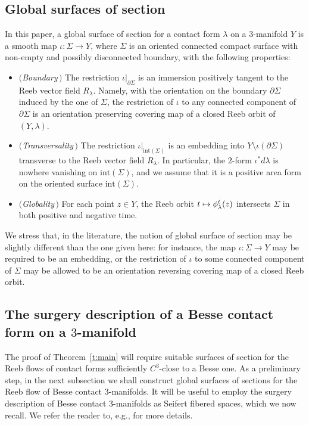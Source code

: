 \documentclass[10pt,a4paper]{amsart}
\newcommand\mto{\mathchoice{\longmapsto}{\mapsto}{\mapsto}{\mapsto}}
\theoremstyle{definition}
\let\diff d
\providecommand{\Subsection}{\subsection}
\begin{document}
\subsection{Global surfaces of section}
\label{s:sos_def}
In this paper, a global surface of section for a contact form $\lambda$ on a $3$-manifold $Y$ is a smooth map $\iota:\Sigma\to Y$, where $\Sigma$ is an oriented connected compact surface with non-empty and possibly disconnected boundary, with the following properties:
\begin{itemize}

\item \textit{$($Boundary$\,)$} The restriction $\iota|_{\partial\Sigma}$ is an immersion positively tangent to the Reeb vector field $R_{\lambda}$. Namely, with the orientation on the boundary $\partial\Sigma$ induced by the one of $\Sigma$,
the restriction of $\iota$ to any connected component of $\partial\Sigma$ is an orientation preserving covering map of a closed Reeb orbit of $(Y,\lambda)$.\vspace{2pt}

\item \textit{$($Transversality$\,)$} The restriction $\iota|_{\mathrm{int}(\Sigma)}$ is an embedding into $Y\setminus\iota(\partial\Sigma)$ transverse to the Reeb vector field $R_\lambda$.
In particular, the $2$-form $\iota^*\diff\lambda$ is nowhere vanishing on $\mathrm{int}(\Sigma)$, and we assume that it is a positive area form on the oriented surface $\mathrm{int}(\Sigma)$.\vspace{2pt}

\item \textit{$($Globality$\,)$} For each point $z\in Y$, the Reeb orbit $t\mto\phi_\lambda^t(z)$ intersects $\Sigma$ in both positive and negative time.

\end{itemize}
We stress that, in the literature, the notion of global surface of section may be slightly different than the one given here: for instance, the map $\iota:\Sigma\to Y$ may be required to be an embedding, or the restriction of $\iota$ to some connected component of $\Sigma$ may be allowed to be an orientation reversing covering map of a closed Reeb orbit.

\Subsection{The surgery description of a Besse contact form on a $3$-manifold}
\label{s:surgery}

The proof of Theorem~\ref{t:main} will require suitable surfaces of section for the Reeb flows of contact forms sufficiently $C^3$-close to a Besse one. As a preliminary step, in the next subsection we shall construct global surfaces of sections for the Reeb flow of Besse contact $3$-manifolds. It will be useful to employ the surgery description of Besse contact $3$-manifolds as Seifert fibered spaces, which we now recall. We refer the reader to, e.g., \cite{Orlik:1972ts,Jankins:1983zm} for more details.
\end{document}
